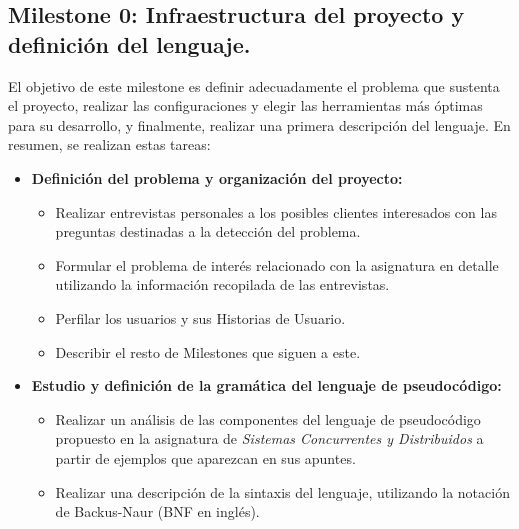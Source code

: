 \subsection{Milestone 0: Infraestructura del proyecto y definición del lenguaje.}
El objetivo de este milestone es definir adecuadamente el problema que sustenta el proyecto, realizar las configuraciones y elegir las herramientas más óptimas para su desarrollo, y finalmente, realizar una primera descripción del lenguaje. En resumen, se realizan estas tareas:
\newpage
\begin{itemize}
    \item \textbf{Definición del problema y organización del proyecto:}
    \begin{itemize}
        \item Realizar entrevistas personales a los posibles clientes interesados con las preguntas destinadas a la detección del problema.
        \item Formular el problema de interés relacionado con la asignatura en detalle utilizando la información recopilada de las entrevistas.
        \item Perfilar los usuarios y sus Historias de Usuario.
        \item Describir el resto de Milestones que siguen a este.
    \end{itemize}
    
    \item \textbf{Estudio y definición de la gramática del lenguaje de pseudocódigo:}
    \begin{itemize}
        \item Realizar un análisis de las componentes del lenguaje de pseudocódigo propuesto en la asignatura de \textit{Sistemas Concurrentes y Distribuidos} a partir de ejemplos que aparezcan en sus apuntes.
        \item Realizar una descripción de la sintaxis del lenguaje, utilizando la notación de Backus-Naur (BNF en inglés).
    \end{itemize}
    

\end{itemize}
